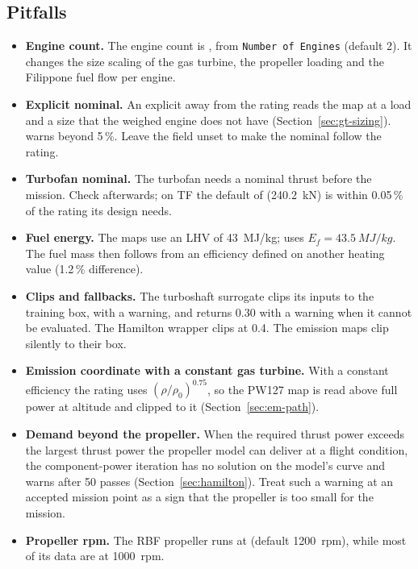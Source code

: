 \documentclass[a4paper,11pt]{article}
\begin{document}
\subsection{Pitfalls}
\begin{itemize}
\item \textbf{Engine count.} The engine count is , from
  \texttt{Number of Engines} (default 2). It changes the size scaling of the gas turbine, the
  propeller loading and the Filippone fuel flow per engine.
\item \textbf{Explicit nominal.} An explicit  away from the rating reads the
  map at a load and a size that the weighed engine does not have
  (Section~\ref{sec:gt-sizing}).  warns beyond 5\,\%. Leave the field
  unset to make the nominal follow the rating.
\item \textbf{Turbofan nominal.} The turbofan needs a nominal thrust before the mission. Check
   afterwards; on TF the default of 
  (\SI{240.2}{kN}) is within 0.05\,\% of the rating its design needs.
\item \textbf{Fuel energy.} The maps use an LHV of \SI{43}{MJ/kg}; 
  uses $E_f = \SI{43.5}{MJ/kg}$. The fuel mass then follows from an efficiency defined on another
  heating value (1.2\,\% difference).
\item \textbf{Clips and fallbacks.} The turboshaft surrogate clips its inputs to the training
  box, with a warning, and returns 0.30 with a warning when it cannot be evaluated. The Hamilton
  wrapper clips at 0.4. The emission maps clip silently to their box.
\item \textbf{Emission coordinate with a constant gas turbine.} With a constant efficiency the
  rating uses $(\rho/\rho_0)^{0.75}$, so the PW127 map is read above full power at altitude and
  clipped to it (Section~\ref{sec:em-path}).
\item \textbf{Demand beyond the propeller.} When the required thrust power exceeds the largest
  thrust power the propeller model can deliver at a flight condition, the component-power
  iteration has no solution on the model's curve and warns after 50 passes
  (Section~\ref{sec:hamilton}). Treat such a warning at an accepted mission point as a sign that
  the propeller is too small for the mission.
\item \textbf{Propeller rpm.} The RBF propeller runs at  (default
  \SI{1200}{rpm}), while most of its data are at \SI{1000}{rpm}.
\end{itemize}
\end{document}
